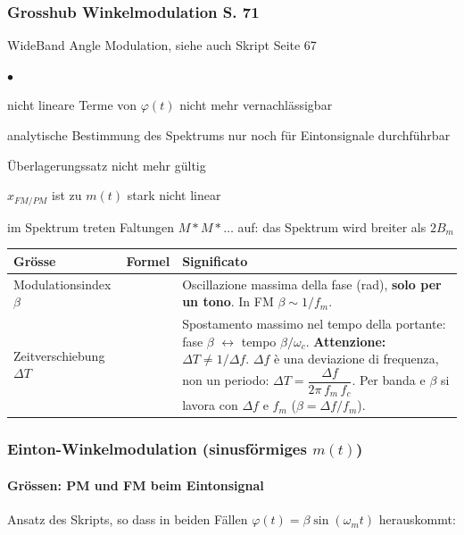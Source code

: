 \subsubsection{Grosshub Winkelmodulation S. 71}
WideBand Angle Modulation, siehe auch Skript Seite 67 \hspace{.3cm} 
	\begin{list}{$\bullet$}{\setlength{\itemsep}{0cm} \setlength{\parsep}{0cm} 	\setlength{\topsep}{0cm}}
	\item nicht lineare Terme von $\varphi (t)$ nicht mehr vernachlässigbar
	\item analytische Bestimmung des Spektrums nur noch für Eintonsignale durchführbar
	\item Überlagerungssatz nicht mehr gültig
	\item $x_{FM/PM}$ ist zu $m(t)$ stark nicht linear
	\item im Spektrum treten Faltungen $M * M * \dots$ auf: das Spektrum wird breiter als $2B_m$
\end{list}
{\renewcommand{\arraystretch}{1.3}
\begin{tabularx}{\linewidth}{|>{\raggedright\arraybackslash}p{.2\linewidth}|>{\centering\arraybackslash}p{.27\linewidth}|>{\raggedright\arraybackslash}X|}
	\hline
	\textbf{Grösse} & \textbf{Formel} & \textbf{Significato} \\ \hline
	Modulationsindex $\beta$ & \efbox[linecolor=red]{$\beta = \dfrac{\Delta \omega}{\omega_m} = \Delta\varphi$} & Oscillazione massima della fase (rad), \textbf{solo per un tono}. In FM $\beta\sim 1/f_m$. \\ \hline
	Zeitverschiebung $\Delta T$ & \efbox[linecolor=red]{$\Delta T=\dfrac{1}{f_c}\cdot \dfrac{\beta}{2\pi}$} & Spostamento massimo nel tempo della portante: fase $\beta$ $\leftrightarrow$ tempo $\beta/\omega_c$. \textbf{Attenzione:} $\Delta T\neq 1/\Delta f$. $\Delta f$ è una deviazione di frequenza, non un periodo: $\Delta T=\dfrac{\Delta f}{2\pi\,f_m\,f_c}$. Per banda e $\beta$ si lavora con $\Delta f$ e $f_m$ ($\beta=\Delta f/f_m$). \\ \hline
\end{tabularx}}

\subsubsection{Einton-Winkelmodulation (sinusförmiges $m(t)$)}
\paragraph{Grössen: PM und FM beim Eintonsignal}
Ansatz des Skripts, so dass in beiden Fällen $\varphi(t) = \beta\sin(\omega_m t)$ herauskommt:

